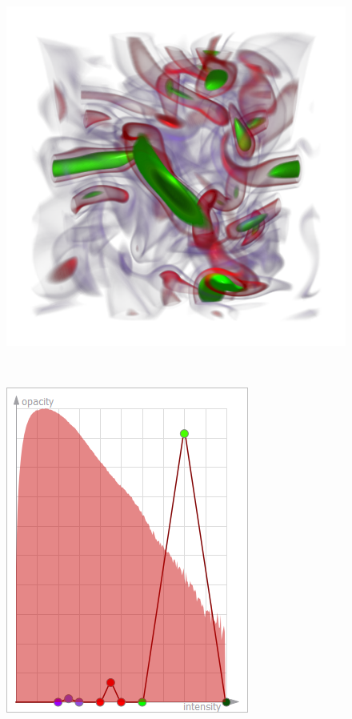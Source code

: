 \begin{figure}
\begin{minipage}{.2\textwidth}
		\subcaption{}
	\end{minipage}~
	\begin{minipage}{.29\textwidth}
		\includegraphics[width=1\linewidth]{figures/vortex_naive_proportional_optimized_linesearch}
		\subcaption{}
	\end{minipage}~
	\begin{minipage}{.2\textwidth}
		\includegraphics[width=1\linewidth]{figures/tf_vortex_naive_proportional_optimized_linesearch}

\end{minipage}
\end{figure}
